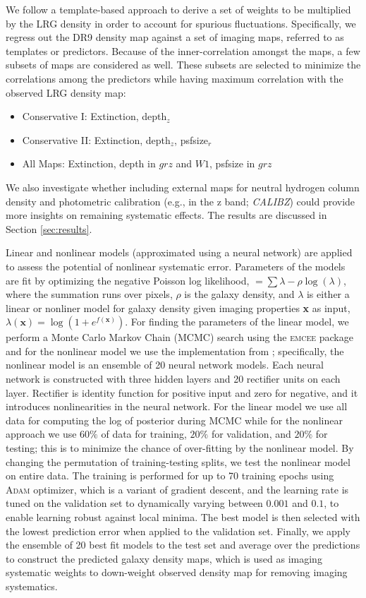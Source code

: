 We follow a template-based approach to derive a set of weights to be multiplied by the LRG density in order to account for spurious fluctuations. Specifically, we regress out the DR9 density map against a set of imaging maps, referred to as templates or predictors.  Because of the inner-correlation amongst the maps, a few subsets of maps are considered as well. These subsets are selected to minimize the correlations among the predictors while having maximum correlation with the observed LRG density map:
\begin{itemize}
\item Conservative I: Extinction, depth$_{z}$
\item Conservative II: Extinction, depth$_{z}$, psfsize$_{r}$
\item All Maps: Extinction, depth in $grz$ and $W1$, psfsize in $grz$
\end{itemize}
We also investigate whether including external maps for neutral hydrogen column density  and photometric calibration (e.g., in the z band; \textit{CALIBZ}) could provide more insights on remaining systematic effects. The results are discussed in Section \ref{sec:results}.

Linear and nonlinear models (approximated using a neural network) are applied to assess the potential of nonlinear systematic error. Parameters of the models are fit by optimizing the negative Poisson log likelihood, $= \sum \lambda - \rho \log(\lambda)$, where the summation runs over pixels, $\rho$ is the galaxy density, and $\lambda$ is either a linear or nonliner model for galaxy density given imaging properties \textbf{x} as input, $\lambda(\textbf{x}) = \log (1+e^{f(\textbf{x})})$. For finding the parameters of the linear model, we perform a Monte Carlo Markov Chain (MCMC) search using the \textsc{emcee} package  and for the nonlinear model we use the implementation from \cite{rezaie2021primordial}; specifically, the nonlinear model is an ensemble of 20 neural network models. Each neural network is constructed with three hidden layers and 20 rectifier units on each layer. Rectifier is identity function for positive input and zero for negative, and it introduces nonlinearities in the neural network. For the linear model we use all data for computing the log of posterior during MCMC while for the nonlinear approach we use $60\%$ of data for training, $20\%$ for validation, and $20\%$ for testing; this is to minimize the chance of over-fitting by the nonlinear model. By changing the permutation of training-testing splits, we test the nonlinear model on entire data. The training is performed for up to 70 training epochs using \textsc{Adam} optimizer, which is a variant of gradient descent, and the learning rate is tuned on the validation set to dynamically varying between $0.001$ and $0.1$, to enable learning robust against local minima. The best model is then selected with the lowest prediction error when applied to the validation set. Finally, we apply the ensemble of 20 best fit models to the test set and average over the predictions to construct the predicted galaxy density maps, which is used as imaging systematic weights to down-weight observed density map for removing imaging systematics. 

